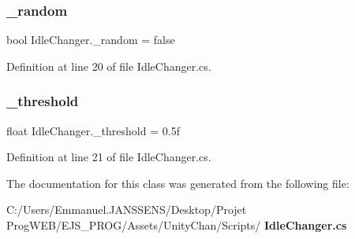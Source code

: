 \mbox{\label{class_idle_changer_a1e089b9cc69af3421729db8f0b4bd161}} 
\subsubsection{\+\_\+random}
{\footnotesize\ttfamily bool Idle\+Changer.\+\_\+random = false}



Definition at line 20 of file Idle\+Changer.\+cs.

\mbox{\label{class_idle_changer_ade071725cc143b847effdaabcc6c11fe}} 
\subsubsection{\+\_\+threshold}
{\footnotesize\ttfamily float Idle\+Changer.\+\_\+threshold = 0.\+5f}



Definition at line 21 of file Idle\+Changer.\+cs.



The documentation for this class was generated from the following file\+:\begin{DoxyCompactItemize}
\item 
C\+:/\+Users/\+Emmanuel.\+J\+A\+N\+S\+S\+E\+N\+S/\+Desktop/\+Projet Prog\+W\+E\+B/\+E\+J\+S\+\_\+\+P\+R\+O\+G/\+Assets/\+Unity\+Chan/\+Scripts/\textbf{ Idle\+Changer.\+cs}\end{DoxyCompactItemize}
